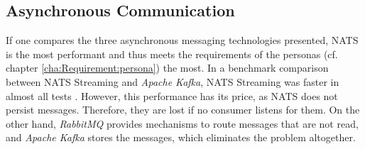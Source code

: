 \pagebreak

\subsection{Asynchronous Communication}\label{cha:Technologies:selection:asynchronous}

If one compares the three asynchronous messaging technologies presented, \ac{NATS} is the most performant and thus meets the requirements of the personas (cf. chapter \ref{cha:Requirement:persona}) the most.
In a benchmark comparison between \ac{NATS} Streaming and \textit{Apache Kafka}, \ac{NATS} Streaming was faster in almost all tests \cite{TylerTreat.2016}.
However, this performance has its price, as \ac{NATS} does not persist messages.
Therefore, they are lost if no consumer listens for them.
On the other hand, \textit{RabbitMQ} provides mechanisms to route messages that are not read, and \textit{Apache Kafka} stores the messages, which eliminates the problem altogether.

